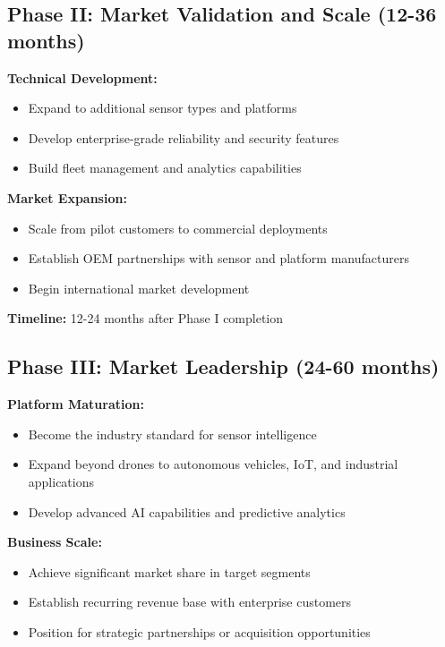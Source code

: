 \documentclass[11pt,letterpaper]{article}
\begin{document}
\subsection*{Phase II: Market Validation and Scale (12-36 months)}

\textbf{Technical Development:}
\begin{itemize}[leftmargin=10pt, itemsep=1pt]
    \item Expand to additional sensor types and platforms
    \item Develop enterprise-grade reliability and security features
    \item Build fleet management and analytics capabilities
\end{itemize}

\textbf{Market Expansion:}
\begin{itemize}[leftmargin=10pt, itemsep=1pt]
    \item Scale from pilot customers to commercial deployments
    \item Establish OEM partnerships with sensor and platform manufacturers
    \item Begin international market development
\end{itemize}

\textbf{Timeline:} 12-24 months after Phase I completion

\subsection*{Phase III: Market Leadership (24-60 months)}

\textbf{Platform Maturation:}
\begin{itemize}[leftmargin=10pt, itemsep=1pt]
    \item Become the industry standard for sensor intelligence
    \item Expand beyond drones to autonomous vehicles, IoT, and industrial applications
    \item Develop advanced AI capabilities and predictive analytics
\end{itemize}

\textbf{Business Scale:}
\begin{itemize}[leftmargin=10pt, itemsep=1pt]
    \item Achieve significant market share in target segments
    \item Establish recurring revenue base with enterprise customers
    \item Position for strategic partnerships or acquisition opportunities
\end{itemize}
\end{document}
